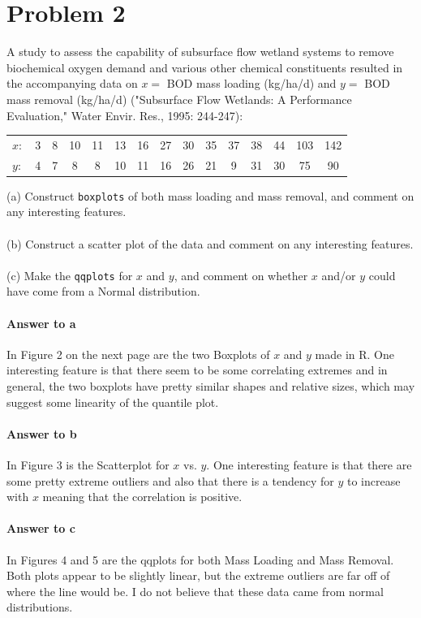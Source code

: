 \documentclass{article}
\newcommand{\code}[1]{\texttt{#1}} %
\newcommand{\p}[1]{\paragraph{#1}} %
\begin{document}

\clearpage
\section*{Problem 2} %

	A study to assess the capability of subsurface flow wetland systems to remove biochemical 
	oxygen demand and various other chemical constituents resulted in the accompanying data on 
	$x =$ BOD mass loading (kg/ha/d) and $y =$ BOD mass removal (kg/ha/d) ("Subsurface Flow 
	Wetlands: A Performance Evaluation," Water Envir. Res., 1995: 244-247):
	
	\begin{table}[!htb]
	\begin{tabular}{ l c c c c c c c c c c c c c c }
		$x:$ & 3 & 8 & 10 & 11 & 13 & 16 & 27 & 30 & 35 & 37 & 38 & 44 & 103 & 142 \\
		$y:$ & 4 & 7 & 8 & 8 & 10 & 11 & 16 & 26 & 21 & 9 & 31 & 30 & 75 & 90 \\
	\end{tabular}
	\end{table}
	
	(a) Construct \code{boxplots} of both mass loading and mass removal, and comment on any 
	interesting features. \\ \\
	(b) Construct a scatter plot of the data and comment on any interesting features. \\ \\
	(c) Make the \code{qqplots} for $x$ and $y$, and comment on whether $x$ and/or $y$ could 
	have come from a Normal distribution.
	
	\p{Answer to a}
	In Figure 2 on the next page are the two Boxplots of $x$ and $y$ made in R. One interesting 
	feature is that there seem to be some correlating extremes and in general, the two boxplots 
	have pretty similar shapes and relative sizes, which may suggest some linearity of the quantile 
	plot.
	
	\p{Answer to b}
	In Figure 3 is the Scatterplot for $x$ vs. $y$. One interesting feature is that there are some 
	pretty extreme outliers and also that there is a tendency for $y$ to increase with $x$ meaning 
	that the correlation is positive.
	
	\p{Answer to c}
	In Figures 4 and 5 are the qqplots for both Mass Loading and Mass Removal. Both plots appear 
	to be slightly linear, but the extreme outliers are far off of where the line would be. I do not 
	believe that these data came from normal distributions.
	
\end{document}

